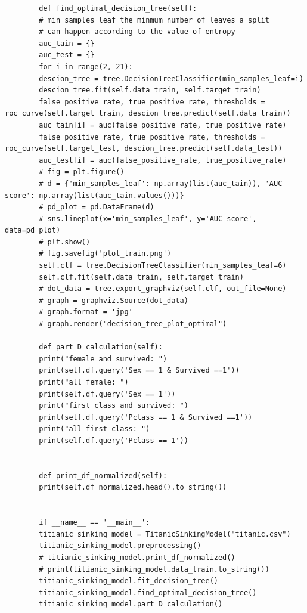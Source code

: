 \documentclass[12pt]{article}
\begin{document}
\begin{lstlisting}
        def find_optimal_decision_tree(self):
        # min_samples_leaf the minmum number of leaves a split
        # can happen according to the value of entropy
        auc_tain = {}
        auc_test = {}
        for i in range(2, 21):
        descion_tree = tree.DecisionTreeClassifier(min_samples_leaf=i)
        descion_tree.fit(self.data_train, self.target_train)
        false_positive_rate, true_positive_rate, thresholds = roc_curve(self.target_train, descion_tree.predict(self.data_train))
        auc_tain[i] = auc(false_positive_rate, true_positive_rate)
        false_positive_rate, true_positive_rate, thresholds = roc_curve(self.target_test, descion_tree.predict(self.data_test))
        auc_test[i] = auc(false_positive_rate, true_positive_rate)
        # fig = plt.figure()
        # d = {'min_samples_leaf': np.array(list(auc_tain)), 'AUC score': np.array(list(auc_tain.values()))}
        # pd_plot = pd.DataFrame(d)
        # sns.lineplot(x='min_samples_leaf', y='AUC score', data=pd_plot)
        # plt.show()
        # fig.savefig('plot_train.png')
        self.clf = tree.DecisionTreeClassifier(min_samples_leaf=6)
        self.clf.fit(self.data_train, self.target_train)
        # dot_data = tree.export_graphviz(self.clf, out_file=None)
        # graph = graphviz.Source(dot_data)
        # graph.format = 'jpg'
        # graph.render("decision_tree_plot_optimal")

        def part_D_calculation(self):
        print("female and survived: ")
        print(self.df.query('Sex == 1 & Survived ==1'))
        print("all female: ")
        print(self.df.query('Sex == 1'))
        print("first class and survived: ")
        print(self.df.query('Pclass == 1 & Survived ==1'))
        print("all first class: ")
        print(self.df.query('Pclass == 1'))


        def print_df_normalized(self):
        print(self.df_normalized.head().to_string())


        if __name__ == '__main__':
        titianic_sinking_model = TitanicSinkingModel("titanic.csv")
        titianic_sinking_model.preprocessing()
        # titianic_sinking_model.print_df_normalized()
        # print(titianic_sinking_model.data_train.to_string())
        titianic_sinking_model.fit_decision_tree()
        titianic_sinking_model.find_optimal_decision_tree()
        titianic_sinking_model.part_D_calculation()

    \end{lstlisting}
\end{document}
